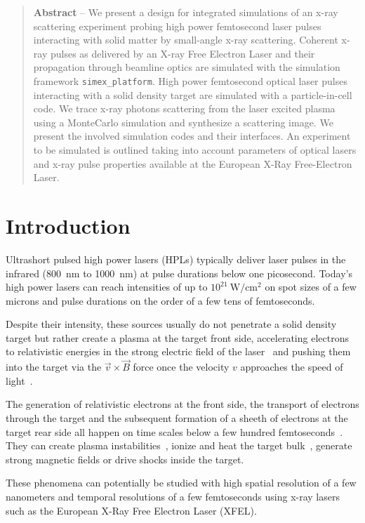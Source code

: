 \documentclass[10pt]{scrartcl}
\begin{document}
\tableofcontents
\begin{abstract}
  \noindent%
  \textbf{Abstract} -- We present a design for integrated simulations of an x-ray scattering
  experiment probing high power femtosecond laser pulses interacting with solid
  matter by small-angle x-ray scattering.
  Coherent x-ray pulses as delivered by an X-ray Free Electron Laser
  and their propagation through beamline optics are simulated with the
  simulation framework \texttt{simex\_platform}. High power femtosecond optical
  laser pulses interacting with a solid density target are simulated with
  a particle-in-cell code. We trace x-ray photons scattering from the laser excited
  plasma using a MonteCarlo simulation and synthesize a scattering image.
  We present the involved simulation codes and their interfaces.
  An experiment to be simulated is outlined taking into account parameters of optical lasers and
  x-ray pulse properties available at the European X-Ray Free-Electron Laser.
\end{abstract}
%
\section{Introduction} Ultrashort pulsed high power lasers (HPLs) typically deliver laser
pulses in the infrared (800~nm to 1000~nm) at pulse durations below one
picosecond. Today's high power lasers \cite{Siebold2008} can reach intensities of
up to $10^{21}~\text{W}/\text{cm}^2$ on spot sizes of a few microns and pulse
durations on the order of a few tens of femtoseconds.

Despite their intensity, these sources usually do not penetrate a solid density
target but rather create a plasma at the target front side, accelerating
electrons to relativistic energies in the strong electric field of the
laser~\cite{Kluge2011} and pushing them into the target via the
$\vec{v}\times\vec{B}$ force once the velocity $v$ approaches the speed of
light~\cite{Mulser2010,Gibbon1996}.

The generation of relativistic electrons at the front side, the transport of
electrons through the target and the subsequent formation of a sheeth of
electrons at the target rear side all happen on time scales below a few hundred
femtoseconds~\cite{Macchi2013}. They can create plasma
instabilities~\cite{Metzkes2014}, ionize and heat the target
bulk~\cite{Huang2013}, generate strong magnetic fields or drive shocks inside
the target.

These phenomena can potentially be studied with high spatial resolution of a few
nanometers and temporal resolutions of a few femtoseconds using x-ray
lasers~\cite{Kluge2014,Kluge2016} such as the European X-Ray Free Electron
Laser (XFEL).
\end{document}
